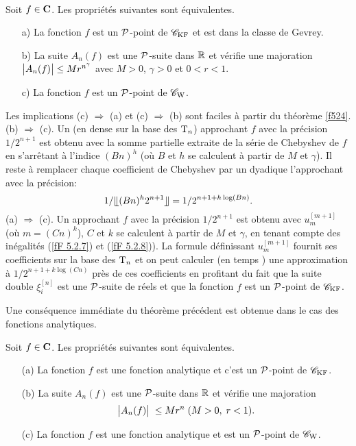 \begin{ftheorem} \label{f527}
~\\
Soit   $f \in {\bf C}$.  Les propriétés suivantes sont équivalentes.
\begin{itemize}\itemsep2pt
%
\item [a)]  La fonction $f$  est  un ${\cal P}$-point de  ${{{\mathscr C}}_{\rm KF}}$  et est dans la classe de Gevrey.
%
\item  [b)]  La suite   $A_n(f)$   est une  ${\cal P}$-suite dans  $\mathbb {R}$   et vérifie une majoration     $\big|{A_n(f)}\big|   \leq Mr^{n^{\gamma}}$
avec   $M > 0$, $\gamma > 0$ et $0 < r < 1$.
%
\item  [c)]  La fonction $f$  est un  ${\cal P}$-point de  ${{{\mathscr C}}_{\rm W}}$.
\end{itemize}

\end{ftheorem}

\proof  Les implications  (c) $\Rightarrow$ (a)  et   (c)   $\Rightarrow$  (b) sont faciles à partir du théorème \ref{f524}. \\   
(b)  $\Rightarrow$  (c). Un \pol (en \pres dense sur la base des ${\rm T}_n$)  approchant $f$  avec la précision  $1/2^{n+1}$  
est obtenu avec la somme partielle extraite de la série de Chebyshev de $f$ en s'arrêtant à l'indice  $(Bn)^h$   (où  $B$  et $h$ se calculent à partir 
de  $M$ et $\gamma$).  
Il reste à remplacer chaque coefficient de Chebyshev par un dyadique l'approchant avec la précision: 
\[
1/ \llfloor (Bn)^h2^{n+1} \rrfloor  = 1/2^{n+1+h \log(Bn)}.
\]
(a)  $\Rightarrow$  (c).  Un \pol  approchant  $f$  avec la précision  
$1/2^{n+1}$  est obtenu avec   $u_m^{[m+1]}$  (où  $m = (Cn)^k$),
$C$ et $k$  se calculent à partir de  $M$ et $\gamma$, en tenant compte des inégalités  (\ref{fF 5.2.7}) et (\ref{fF 5.2.8})).   
La formule définissant  $u_m^{[m+1]}$   fournit ses coefficients sur la base des  ${\rm T}_n$  et on peut calculer (en temps \poll)  une approximation à  $1/2^{n+1+k \log(Cn)}$  près de ces coefficients en profitant du fait que la suite double $\xi_i^{[n]}$ est une  ${\cal P}$-suite de réels et que la fonction $f$ est  un ${\cal P}$-point de  ${{{\mathscr C}}_{\rm KF}}$.  \eop

\smallskip Une conséquence immédiate du théorème précédent est obtenue dans le 
cas des fonctions analytiques.

\begin{ftheorem} \label{f528}
Soit   $f \in {\bf C}$.  Les propriétés suivantes sont équivalentes. 
\begin{itemize}

\item [(a)] La fonction $f$ est une fonction analytique et c'est un ${\cal P}$-point 
de  ${{{\mathscr C}}_{\rm KF}}$.

\item [(b)] La suite  $A_n(f)$  est une  ${\cal P}$-suite dans  $\mathbb {R}$  et vérifie 
une majoration
$$ \big|{A_n(f)}\big|\;  \leq Mr^n \; (M > 0, \; r < 1).$$

\item [(c)] La fonction $f$ est une fonction analytique et est un  ${\cal P}$-point de ${{{\mathscr C}}_{\rm W}}$.
\end{itemize}
\end{ftheorem}

